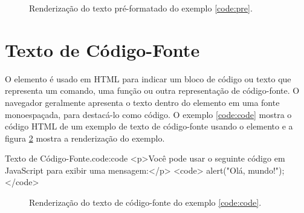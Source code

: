 \begin{figure}[htpb!]    
    \caption{Renderização do texto pré-formatado do exemplo \ref{code:pre}.}
    \label{fig:pre}
\end{figure}

\section{Texto de Código-Fonte}

O elemento  é usado em HTML para indicar um bloco de código ou texto que representa um comando, uma função ou outra representação de código-fonte. O navegador geralmente apresenta o texto dentro do elemento  em uma fonte monoespaçada, para destacá-lo como código. O exemplo \ref{code:code} mostra o código HTML de um exemplo de texto de código-fonte usando o elemento  e a figura \ref{fig:code} mostra a renderização do exemplo.

\begin{htmlcode}{Texto de Código-Fonte.}{code:code}
<p>Você pode usar o seguinte código em JavaScript para exibir uma mensagem:</p>
<code>
  alert("Olá, mundo!");
</code>
\end{htmlcode}

\begin{figure}[ht!]    
    \caption{Renderização do texto de código-fonte do exemplo \ref{code:code}.}
    \label{fig:code}
\end{figure}

